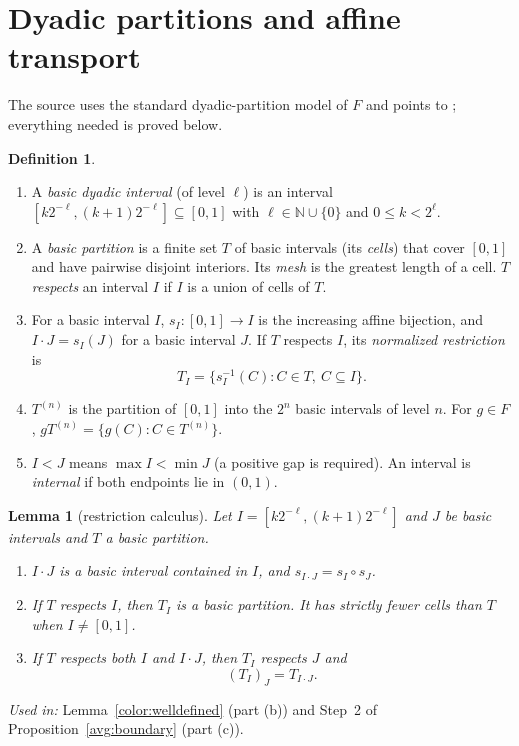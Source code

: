 \documentclass[11pt]{article}
\newcommand{\N}{\mathbb N}
\newtheorem{lemma}[theorem]{Lemma}
\theoremstyle{definition}
\newtheorem{definition}[theorem]{Definition}
\numberwithin{equation}{section}
\begin{document}
\section{Dyadic partitions and affine transport}\label{sec:dyadic}

The source uses the standard dyadic-partition model of \(F\) and points to
\cite[Section~2, Lemma~2.2]{CannonFloydParry1996}; everything needed is
proved below.

\begin{definition}\label{dyad:defs}
\begin{enumerate}[label=(\alph*)]
\item A \emph{basic dyadic interval} (of level \(\ell\)) is an interval
\([k2^{-\ell},(k+1)2^{-\ell}]\subseteq[0,1]\) with
\(\ell\in\N\cup\{0\}\) and \(0\le k<2^\ell\).
\item A \emph{basic partition} is a finite set \(T\) of basic intervals
(its \emph{cells}) that cover \([0,1]\) and have pairwise disjoint
interiors. Its \emph{mesh} is the greatest length of a cell. \(T\)
\emph{respects} an interval \(I\) if \(I\) is a union of cells of \(T\).
\item For a basic interval \(I\), \(s_I:[0,1]\to I\) is the increasing
affine bijection, and \(I\cdot J=s_I(J)\) for a basic interval \(J\).
If \(T\) respects \(I\), its \emph{normalized restriction} is
\[
  T_I=\{s_I^{-1}(C):C\in T,\ C\subseteq I\}.
\]
\item \(T^{(n)}\) is the partition of \([0,1]\) into the \(2^n\) basic
intervals of level \(n\). For \(g\in F\), \(gT^{(n)}=\{g(C):C\in T^{(n)}\}\).
\item \(I<J\) means \(\max I<\min J\) (a positive gap is required). An
interval is \emph{internal} if both endpoints lie in \((0,1)\).
\end{enumerate}
\end{definition}

\begin{lemma}[restriction calculus]\label{dyad:calculus}
Let \(I=[k2^{-\ell},(k+1)2^{-\ell}]\) and \(J\) be basic intervals and
\(T\) a basic partition.
\begin{enumerate}[label=(\alph*)]
\item \(I\cdot J\) is a basic interval contained in \(I\), and
\(s_{I\cdot J}=s_I\circ s_J\).
\item If \(T\) respects \(I\), then \(T_I\) is a basic partition. It has
strictly fewer cells than \(T\) when \(I\ne[0,1]\).
\item If \(T\) respects both \(I\) and \(I\cdot J\), then \(T_I\) respects
\(J\) and
\begin{equation}\label{dyad:restriction}
  (T_I)_J=T_{I\cdot J}.
\end{equation}
\end{enumerate}
\end{lemma}
\noindent\emph{Used in:} Lemma~\ref{color:welldefined} (part (b)) and
Step~2 of Proposition~\ref{avg:boundary} (part (c)).
\end{document}
